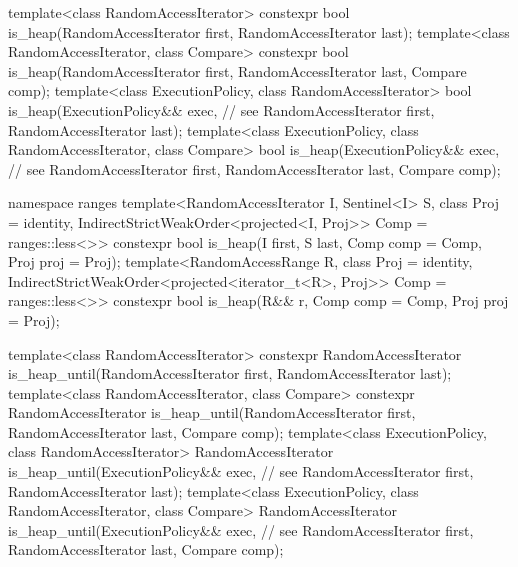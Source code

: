 \begin{codeblock}
  template<class RandomAccessIterator>
    constexpr bool is_heap(RandomAccessIterator first, RandomAccessIterator last);
  template<class RandomAccessIterator, class Compare>
    constexpr bool is_heap(RandomAccessIterator first, RandomAccessIterator last,
                           Compare comp);
  template<class ExecutionPolicy, class RandomAccessIterator>
    bool is_heap(ExecutionPolicy&& exec, // see 
                 RandomAccessIterator first, RandomAccessIterator last);
  template<class ExecutionPolicy, class RandomAccessIterator, class Compare>
    bool is_heap(ExecutionPolicy&& exec, // see 
                 RandomAccessIterator first, RandomAccessIterator last,
                 Compare comp);
\end{codeblock}\begin{addedblock}\begin{codeblock}
  namespace ranges {
    template<RandomAccessIterator I, Sentinel<I> S, class Proj = identity,
        IndirectStrictWeakOrder<projected<I, Proj>> Comp = ranges::less<>>
      constexpr bool is_heap(I first, S last, Comp comp = Comp{}, Proj proj = Proj{});
    template<RandomAccessRange R, class Proj = identity,
        IndirectStrictWeakOrder<projected<iterator_t<R>, Proj>> Comp = ranges::less<>>
      constexpr bool is_heap(R&& r, Comp comp = Comp{}, Proj proj = Proj{});
  }
\end{codeblock}\end{addedblock}\begin{codeblock}
  template<class RandomAccessIterator>
    constexpr RandomAccessIterator
      is_heap_until(RandomAccessIterator first, RandomAccessIterator last);
  template<class RandomAccessIterator, class Compare>
    constexpr RandomAccessIterator
      is_heap_until(RandomAccessIterator first, RandomAccessIterator last,
                    Compare comp);
  template<class ExecutionPolicy, class RandomAccessIterator>
    RandomAccessIterator
      is_heap_until(ExecutionPolicy&& exec, // see 
                    RandomAccessIterator first, RandomAccessIterator last);
  template<class ExecutionPolicy, class RandomAccessIterator, class Compare>
    RandomAccessIterator
      is_heap_until(ExecutionPolicy&& exec, // see 
                    RandomAccessIterator first, RandomAccessIterator last,
                    Compare comp);
\end{codeblock}\begin{addedblock}\begin{codeblock}

\end{codeblock}
\end{addedblock}

